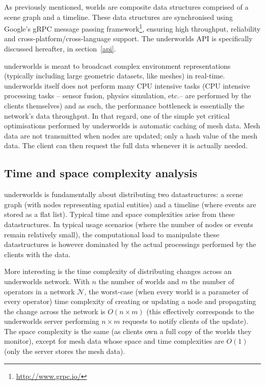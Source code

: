 \documentclass[letterpaper, 10pt, conference]{ieeeconf}
\newcommand{\etc}{etc.\xspace}
\newcommand{\uwds}{{\sc underworlds}\xspace}
\begin{document}
As previously mentioned, worlds are composite data structures comprised of a
scene graph and a timeline. These data structures are synchronised using
Google's gRPC message passing framework\footnote{\url{http://www.grpc.io/}}, ensuring
high throughput, reliability and cross-platform/cross-language support. The \uwds
API is specifically discussed hereafter, in section~\ref{api}.


\uwds is meant to broadcast complex environment representations (typically
including large geometric datasets, like meshes) in real-time. \uwds itself does
not perform many CPU intensive tasks (CPU intensive processing tasks -- sensor
fusion, physics simulation, \etc -- are performed by the clients themselves) and
as such, the performance bottleneck is essentially the network's data
throughput.  In that regard, one of the simple yet critical optimisations
performed by \uwds is automatic caching of mesh data. Mesh data are not
transmitted when nodes are updated; only a hash value of the mesh data. The
client can then request the full data whenever it is actually needed.


\subsection{Time and space complexity analysis}

\uwds is fundamentally about distributing two datastructures: a scene graph
(with nodes representing spatial entities) and a timeline (where events are
stored as a flat list). Typical time and space complexities arise from these
datastructures. In typical usage scenarios (where the number of nodes or events
remain relatively small), the computational load to manipulate these
datastructures is however dominated by the actual processings performed by the
clients with the data.

More interesting is the time complexity of distributing changes across an \uwds
network. With $n$ the number of worlds and $m$ the number of operators in a
network $\mathcal{N}$, the worst-case (when every world is a parameter of every
operator) time complexity of creating or updating a node and propagating the
change across the network is $O(n \times m)$ (this effectively corresponds to
the \uwds server performing $n \times m$ requests to notify clients of the
update).  The space complexity is the same (as clients own a full copy of the
worlds they monitor), except for mesh data whose space and time complexities are
$O(1)$ (only the server stores the mesh data).
\end{document}
